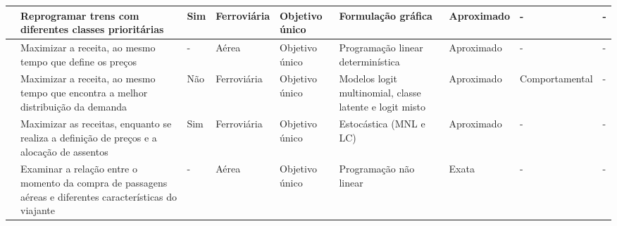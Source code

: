 \begin{center}
\begin{longtable}{|M{2cm}|M{3.7cm}|M{0.5cm}|M{1.1cm}|M{1cm}|M{2cm}|M{1.7cm}|M{1.7cm}|M{1.5cm}|}
		\citep{CORMAN201114}      &  Reprogramar trens com diferentes classes prioritárias                                                                                                & Sim                 & Ferroviária          &  Objetivo único          &  Formulação gráfica                                      & Aproximado                                      & -                        & -                                                         \\ \hline
		\citep{Erdelyi2011}       &  Maximizar a receita, ao mesmo tempo que define os preços                                                                                             & -                   & Aérea                &  Objetivo único          &  Programação linear determinística                       & Aproximado                                      & -                        & -                                                         \\ \hline
		\citep{HETRAKUL20131}     &  Maximizar a receita, ao mesmo tempo que encontra a melhor distribuição da demanda                                                                    & Não                 & Ferroviária          &  Objetivo único          &  Modelos logit multinomial, classe latente e logit misto & Aproximado                                      & Comportamental           & -                                                         \\ \hline
		\citep{HETRAKUL201468}    &  Maximizar as receitas, enquanto se realiza a definição de preços e a alocação de assentos                                                            & Sim                 & Ferroviária          &  Objetivo único          &  Estocástica (MNL e LC)                                  & Aproximado                                      & -                        & -                                                         \\ \hline
		\citep{WEN201791}         &  Examinar a relação entre o momento da compra de passagens aéreas e diferentes características do viajante                                            & -                   & Aérea                &  Objetivo único          &  Programação não linear                                  & Exata                                           & -                        & -                                                         \\ \hline

\end{longtable}
\end{center}
